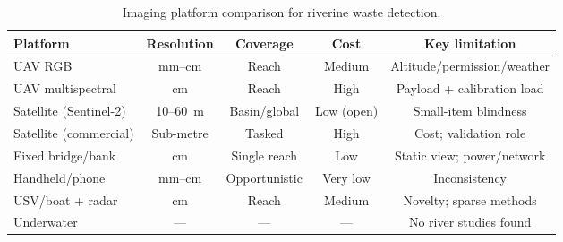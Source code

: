 \begin{table}[!t]
\centering
\caption{Imaging platform comparison for riverine waste detection.}
\label{tab:platforms}
\begin{tabular}{lcccc}
\hline
\textbf{Platform} & \textbf{Resolution} & \textbf{Coverage} & \textbf{Cost} & \textbf{Key limitation} \\
\hline
UAV RGB & mm--cm & Reach & Medium & Altitude/permission/weather \\
UAV multispectral & cm & Reach & High & Payload + calibration load \\
Satellite (Sentinel-2) & 10--60~m & Basin/global & Low (open) & Small-item blindness \\
Satellite (commercial) & Sub-metre & Tasked & High & Cost; validation role \\
Fixed bridge/bank & cm & Single reach & Low & Static view; power/network \\
Handheld/phone & mm--cm & Opportunistic & Very low & Inconsistency \\
USV/boat + radar & cm & Reach & Medium & Novelty; sparse methods \\
Underwater & --- & --- & --- & No river studies found \\
\hline
\end{tabular}
\end{table}
